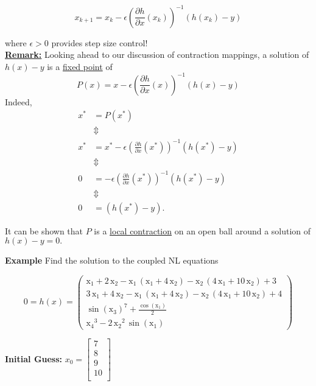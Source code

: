 \documentclass[letterpaper]{article}
\newcommand{\pardiff}[2][]{\frac{\partial#1}{\partial#2}}
\begin{document}
\begin{enumerate}
$$\boxed{x_{k+1} = x_k-\epsilon\left(\pardiff[h]{x}(x_k)\right)^{-1}(h(x_k)-y)}$$

where $\epsilon>0$ provides step size control!\\

\textbf{\underline{Remark:}} Looking ahead to our discussion of contraction mappings, a solution of $h(x)-y$ is a \underline{fixed point} of
$$\boxed{P(x)=x-\epsilon\left(\pardiff[h]{x}(x)\right)^{-1}(h(x)-y)}$$
Indeed,
\begin{align*}
x^* & = P(x^*) \\
&\Updownarrow \\
x^*&=x^*-\epsilon\left(\pardiff[h]{x}(x^*)\right)^{-1}(h(x^*)-y)\\
&\Updownarrow \\
0&=-\epsilon\left(\pardiff[h]{x}(x^*)\right)^{-1}(h(x^*)-y)\\
&\Updownarrow \\
0&=(h(x^*)-y).
\end{align*}

It can be shown that $P$ is a \underline{local contraction} on an open ball around a solution of $h(x)-y=0.$

\newpage

\noindent \textbf{Example} Find the solution to the coupled NL equations

$$0 = h(x)=
\left(\begin{array}{c} \mathrm{x_1} + 2\, \mathrm{x_2} - \mathrm{x_1}\, \left(\mathrm{x_1} + 4\, \mathrm{x_2}\right) - \mathrm{x_2}\, \left(4\, \mathrm{x_1} + 10\, \mathrm{x_2}\right) + 3\\ 3\, \mathrm{x_1} + 4\, \mathrm{x_2} - \mathrm{x_1}\, \left(\mathrm{x_1} + 4\, \mathrm{x_2}\right) - \mathrm{x_2}\, \left(4\, \mathrm{x_1} + 10\, \mathrm{x_2}\right) + 4\\ {\sin\!\left(\mathrm{x_3}\right)}^7 + \frac{\cos\!\left(\mathrm{x_1}\right)}{2}\\ {\mathrm{x_4}}^3 - 2\, {\mathrm{x_2}}^2\, \sin\!\left(\mathrm{x_1}\right) \end{array}\right)
$$
\vspace*{1cm}

\textbf{Initial Guess:} $x_0 = \begin{bmatrix}  7\\
     8\\
     9\\
    10\\
    \end{bmatrix} $



\end{enumerate}
\end{document}
